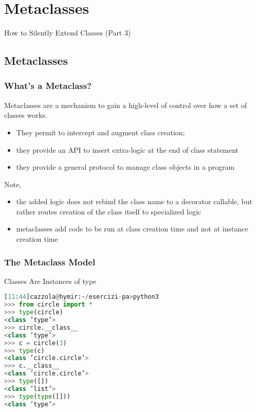 \section{Metaclasses}

How to Silently Extend Classes (Part 3)

\subsection{Metaclasses}

\subsubsection{What’s a Metaclass?}

Metaclasses are a mechanism to gain a high-level of control over how a set of classes works.

\begin{itemize}
	\item They permit to intercept and augment class creation;
	\item they provide an API to insert extra-logic at the end of class statement
	\item they provide a general protocol to manage class objects in a program
\end{itemize}

Note,

\begin{itemize}
	\item the added logic does not rebind the class name to a decorator callable, but rather routes creation of the class itself to specialized logic
	\item metaclasses add code to be run at class creation time and not at instance creation time
\end{itemize}

\subsubsection{The Metaclass Model}

Classes Are Instances of type

\begin{lstlisting}[language=Python]
[11:44]cazzola@hymir:~/esercizi-pa>python3
>>> from circle import *
>>> type(circle)
<class ’type’>
>>> circle.__class__
<class ’type’>
>>> c = circle(3)
>>> type(c)
<class ’circle.circle’>
>>> c.__class__
<class ’circle.circle’>
>>> type([])
<class ’list’>
>>> type(type([]))
<class ’type’>
\end{lstlisting}

